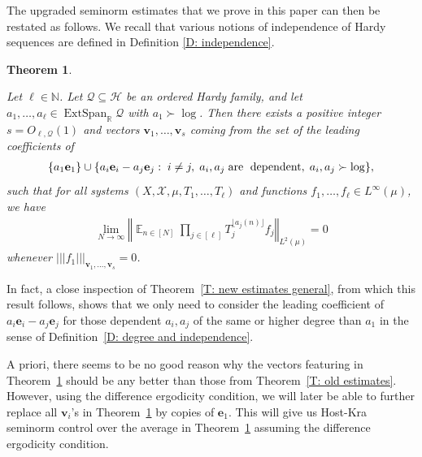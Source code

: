 \documentclass[11pt]{amsart}
\newtheorem{theorem}[lemma]{Theorem}
\theoremstyle{definition}
\DeclareMathOperator*{\E}{\mathbb{E}}
\newcommand{\N}{{\mathbb N}}
\newcommand{\R}{{\mathbb R}}
\newcommand{\CH}{{\mathcal H}}
\newcommand{\CQ}{{\mathcal Q}}
\newcommand{\CX}{{\mathcal X}}
\newcommand{\be}{{\mathbf{e}}}
\newcommand{\bv}{{\mathbf{v}}}
\newcommand{\norm}[1]{\left\Vert #1\right\Vert}
\newcommand{\nnorm}[1]{\lvert\!|\!| #1|\!|\!\rvert}
\newcommand{\1}{{\mathbf{1}}}
\DeclareMathOperator{\extspan}{ExtSpan}
\newcommand{\abs}[1]{\mathopen{}\left| #1\mathclose{}\right|}
\newcommand{\sfloor}[1]{{\lfloor #1 \rfloor}}
\begin{document}
The upgraded seminorm estimates that we prove in this paper can then be restated as follows. We recall that various notions of independence of Hardy sequences are defined in Definition \ref{D: independence}. 
     \begin{theorem}\label{T: new estimates}

        Let $\ell\in\N$. Let $\CQ\subseteq\CH$ be an ordered Hardy family, and let $a_1, \ldots, a_\ell\in\extspan_\R\CQ$ with $a_1\succ \log$.  Then there exists a positive integer $s=O_{\ell, \CQ}(1)$ and vectors $\bv_{1},\dots,\bv_{s}$ coming from the set of the leading coefficients of 
        \begin{align*}
            \{a_1 \be_1\}\cup\{a_i \be_i - a_j \be_j:\; i\neq j,\; a_i, a_j\; \textrm{are\; dependent},\; a_i, a_j\succ \log\},
        \end{align*}
         such that for all systems $(X, \CX, \mu, T_1, \ldots, T_\ell)$ and functions $f_1, \ldots, f_\ell\in L^\infty(\mu)$, we have 
\begin{align}\label{goal00}
        \lim_{N\to\infty} %
         \norm{\E_{n\in [N]} 
         \prod_{j\in[\ell]}  T_{j}^{\sfloor{a_{j}(n)}} f_{j}}_{L^2(\mu)}=0
    \end{align}
    whenever $\nnorm{f_1}_{\bv_{1},\dots,\bv_{s}}=0$. 
    \end{theorem}
    In fact, a close inspection of Theorem~\ref{T: new estimates general}, from which this result follows, shows that we only need to consider the leading coefficient of $a_i \be_i - a_j \be_j$ for those dependent $a_i, a_j$ of the same or higher degree than $a_1$ in the sense of Definition~\ref{D: degree and independence}.


A priori, there seems to be no good reason why the vectors featuring in Theorem~\ref{T: new estimates} should be any better than those from Theorem~\ref{T: old estimates}. However, using the difference ergodicity condition, we will later be able to further replace all $\bv_i$'s in Theorem~\ref{T: new estimates} by copies of $\be_1$. This will give us Host-Kra seminorm control over the average in Theorem~\ref{T: new estimates} assuming the difference ergodicity condition.
\end{document}
